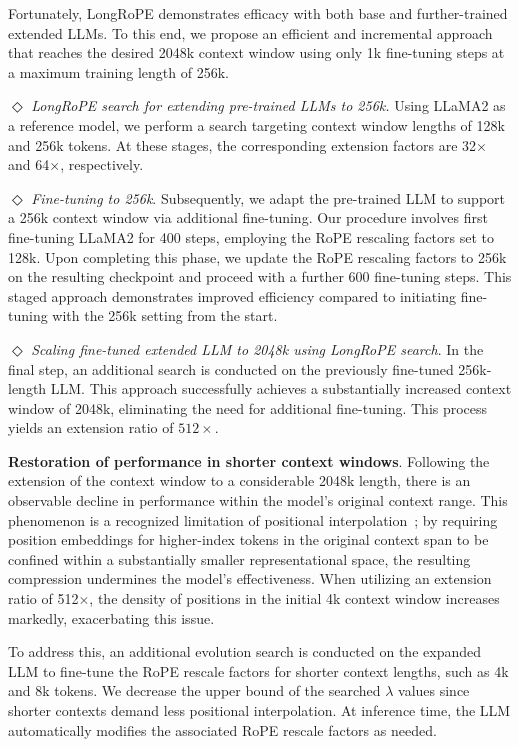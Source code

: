 Fortunately, LongRoPE demonstrates efficacy with both base and further-trained extended LLMs. To this end, we propose an efficient and incremental approach that reaches the desired 2048k context window using only 1k fine-tuning steps at a maximum training length of 256k.

$\Diamond$ \textit{LongRoPE search for extending pre-trained LLMs to 256k.} Using LLaMA2 as a reference model, we perform a search targeting context window lengths of 128k and 256k tokens. At these stages, the corresponding extension factors are 32$\times$ and 64$\times$, respectively.

$\Diamond$ \textit{Fine-tuning to 256k}. Subsequently, we adapt the pre-trained LLM to support a 256k context window via additional fine-tuning. Our procedure involves first fine-tuning LLaMA2 for 400 steps, employing the RoPE rescaling factors set to 128k. Upon completing this phase, we update the RoPE rescaling factors to 256k on the resulting checkpoint and proceed with a further 600 fine-tuning steps. This staged approach demonstrates improved efficiency compared to initiating fine-tuning with the 256k setting from the start.

$\Diamond$ \textit{Scaling fine-tuned extended LLM to 2048k using LongRoPE search}. In the final step, an additional search is conducted on the previously fine-tuned 256k-length LLM. This approach successfully achieves a substantially increased context window of 2048k, eliminating the need for additional fine-tuning. This process yields an extension ratio of $512\times$.

\textbf{Restoration of performance in shorter context windows}. Following the extension of the context window to a considerable 2048k length, there is an observable decline in performance within the model's original context range. This phenomenon is a recognized limitation of positional interpolation~\cite{pi}; by requiring position embeddings for higher-index tokens in the original context span to be confined within a substantially smaller representational space, the resulting compression undermines the model's effectiveness. When utilizing an extension ratio of 512$\times$, the density of positions in the initial 4k context window increases markedly, exacerbating this issue.

To address this, an additional evolution search is conducted on the expanded LLM to fine-tune the RoPE rescale factors for shorter context lengths, such as 4k and 8k tokens. We decrease the upper bound of the searched $\lambda$ values since shorter contexts demand less positional interpolation. At inference time, the LLM automatically modifies the associated RoPE rescale factors as needed.

